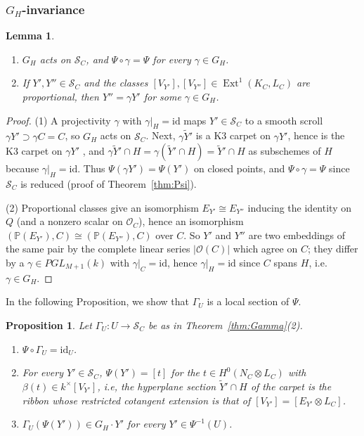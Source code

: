 \documentclass[11pt,reqno]{amsart}
\theoremstyle{plain}
\newtheorem{proposition}[theorem]{Proposition}
\newtheorem{lemma}[theorem]{Lemma}
\theoremstyle{definition}
\newcommand{\PP}{\mathbb{P}}
\newcommand{\OO}{\mathcal{O}}
\newcommand{\Ext}{\operatorname{Ext}}
\newcommand{\id}{\mathrm{id}}
\newcommand{\Yt}{\widetilde{Y}}
\newcommand{\SC}{\mathcal{S}_C}
\newcommand{\GH}{G_H}
\begin{document}
\subsubsection*{$\GH$-invariance}

\begin{lemma}\label{lem:GH}
\begin{enumerate}
\item $\GH$ acts on $\SC$, and $\Psi\circ\gamma=\Psi$ for every $\gamma\in\GH$.
\item If $Y',Y''\in\SC$ and the classes $[V_{Y'}],[V_{Y''}]\in\Ext^1(K_C,L_C)$ are proportional, then $Y''=\gamma Y'$ for some $\gamma\in\GH$.
\end{enumerate}
\end{lemma}

\begin{proof}
(1) A projectivity $\gamma$ with $\gamma|_H=\id$ maps $Y'\in\SC$ to a smooth scroll $\gamma Y'\supset\gamma C=C$, so $\GH$ acts on $\SC$. Next, $\gamma\Yt'$ is a K3 carpet on $\gamma Y'$, hence is the K3 carpet on $\gamma Y'$ \cite[Prop.~1.7]{GP97}, and $\gamma\Yt'\cap H=\gamma(\Yt'\cap H)=\Yt'\cap H$ as subschemes of $H$ because $\gamma|_H=\id$. Thus $\Psi(\gamma Y')=\Psi(Y')$ on closed points, and $\Psi\circ\gamma=\Psi$ since $\SC$ is reduced (proof of Theorem~\ref{thm:Psi}).

(2) Proportional classes give an isomorphism $E_{Y'}\cong E_{Y''}$ inducing the identity on $Q$ (and a nonzero scalar on $\OO_C$), hence an isomorphism $(\PP(E_{Y'}),C)\cong(\PP(E_{Y''}),C)$ over $C$. So $Y'$ and $Y''$ are two embeddings of the same pair by the complete linear series $|\OO(C)|$ which agree on $C$; they differ by a $\gamma\in PGL_{M+1}(k)$ with $\gamma|_C=\id$, hence $\gamma|_H=\id$ since $C$ spans $H$, i.e.\ $\gamma\in\GH$.
\end{proof}

In the following Proposition, we show that $\Gamma_U$ is a local section of $\Psi$.

\begin{proposition}\label{prop:BEsection}
Let $\Gamma_U\colon U\to\SC$ be as in Theorem~\ref{thm:Gamma}(2).
\begin{enumerate}
\item $\Psi\circ\Gamma_U=\id_U$.
\item For every $Y'\in\SC$, $\Psi(Y')=[t]$ for the $t\in H^0(N_C\otimes L_C)$ with $\beta(t)\in k^{\times}[V_{Y'}]$, i.e, the hyperplane section $\Yt'\cap H$ of the carpet is the ribbon whose restricted cotangent extension is that of $[V_{Y'}]=[E_{Y'}\otimes L_C]$.
\item $\Gamma_U(\Psi(Y'))\in\GH\cdot Y'$ for every $Y'\in\Psi^{-1}(U)$.
\end{enumerate}
\end{proposition}
\end{document}
